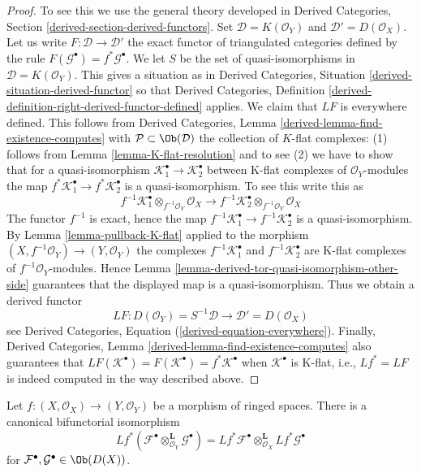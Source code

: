 \begin{proof}
To see this we use the general theory developed in
Derived Categories, Section \ref{derived-section-derived-functors}.
Set $\mathcal{D} = K(\mathcal{O}_Y)$ and $\mathcal{D}' = D(\mathcal{O}_X)$.
Let us write $F : \mathcal{D} \to \mathcal{D}'$ the exact functor
of triangulated categories defined by the rule
$F(\mathcal{G}^\bullet) = f^*\mathcal{G}^\bullet$.
We let $S$ be the set of quasi-isomorphisms in
$\mathcal{D} = K(\mathcal{O}_Y)$.
This gives a situation as in
Derived Categories, Situation \ref{derived-situation-derived-functor}
so that
Derived Categories, Definition
\ref{derived-definition-right-derived-functor-defined}
applies. We claim that $LF$ is everywhere defined.
This follows from
Derived Categories, Lemma \ref{derived-lemma-find-existence-computes}
with $\mathcal{P} \subset \Ob(\mathcal{D})$ the collection
of $K$-flat complexes: (1) follows from
Lemma \ref{lemma-K-flat-resolution}
and to see (2) we have to show that for a quasi-isomorphism
$\mathcal{K}_1^\bullet  \to \mathcal{K}_2^\bullet$ between
K-flat complexes of $\mathcal{O}_Y$-modules the map
$f^*\mathcal{K}_1^\bullet  \to f^*\mathcal{K}_2^\bullet$ is a
quasi-isomorphism. To see this write this as
$$
f^{-1}\mathcal{K}_1^\bullet \otimes_{f^{-1}\mathcal{O}_Y} \mathcal{O}_X
\longrightarrow
f^{-1}\mathcal{K}_2^\bullet \otimes_{f^{-1}\mathcal{O}_Y} \mathcal{O}_X
$$
The functor $f^{-1}$ is exact, hence the map
$f^{-1}\mathcal{K}_1^\bullet  \to f^{-1}\mathcal{K}_2^\bullet$ is a
quasi-isomorphism. By
Lemma \ref{lemma-pullback-K-flat}
applied to the morphism $(X, f^{-1}\mathcal{O}_Y) \to (Y, \mathcal{O}_Y)$
the complexes $f^{-1}\mathcal{K}_1^\bullet$ and $f^{-1}\mathcal{K}_2^\bullet$
are K-flat complexes of $f^{-1}\mathcal{O}_Y$-modules. Hence
Lemma \ref{lemma-derived-tor-quasi-isomorphism-other-side}
guarantees that the displayed map is a quasi-isomorphism.
Thus we obtain a derived functor
$$
LF :
D(\mathcal{O}_Y) = S^{-1}\mathcal{D}
\longrightarrow
\mathcal{D}' = D(\mathcal{O}_X)
$$
see
Derived Categories, Equation (\ref{derived-equation-everywhere}).
Finally,
Derived Categories, Lemma \ref{derived-lemma-find-existence-computes}
also guarantees that
$LF(\mathcal{K}^\bullet) = F(\mathcal{K}^\bullet) = f^*\mathcal{K}^\bullet$
when $\mathcal{K}^\bullet$ is K-flat, i.e., $Lf^* = LF$ is
indeed computed in the way described above.
\end{proof}

\begin{lemma}
\label{lemma-pullback-tensor-product}
Let $f : (X, \mathcal{O}_X) \to (Y, \mathcal{O}_Y)$
be a morphism of ringed spaces. There is a canonical bifunctorial
isomorphism
$$
Lf^*(
\mathcal{F}^\bullet \otimes_{\mathcal{O}_Y}^{\mathbf{L}} \mathcal{G}^\bullet
) =
Lf^*\mathcal{F}^\bullet 
\otimes_{\mathcal{O}_X}^{\mathbf{L}}
Lf^*\mathcal{G}^\bullet 
$$
for $\mathcal{F}^\bullet, \mathcal{G}^\bullet \in \Ob(D(X))$.
\end{lemma}

